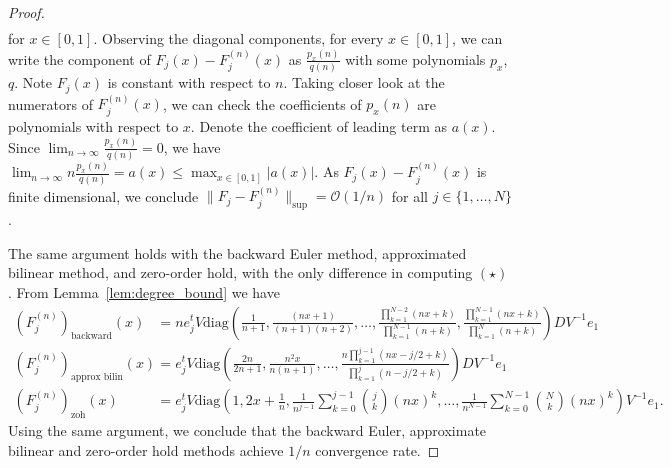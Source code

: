 \documentclass{article}
\theoremstyle{definition}
\newcommand{\pr}[1]{ \left( #1 \right) }
\newcommand{\abs}[1]{\left| #1 \right|}
\begin{document}
\begin{proof}
\begin{align*}
 \end{align*}
for $x \in [0,1]$. 
Observing the diagonal components, 
for every $x\in[0,1]$, we can write the component of $F_j(x)-F_j^{(n)}(x)$ as $\frac{p_x(n)}{q(n)}$ with some polynomials $p_x$, $q$. Note $F_j(x)$ is constant with respect to $n$. Taking closer look at the numerators of $F_j^{(n)}(x)$, we can check the coefficients of $p_x(n)$ are polynomials with respect to $x$. Denote the coefficient of leading term as $a(x)$. 
Since $\lim_{n\to\infty} \frac{p_x(n)}{q(n)}=0$, we have $\lim_{n\to\infty} n\frac{p_x(n)}{q(n)}=a(x) \le \max_{x\in[0,1]} \abs{a(x)}$. As $F_j(x)-F_j^{(n)}(x)$ is finite dimensional, we conclude $\|F_j-F_j^{(n)}\|_{\sup} = \mathcal{O}(1/n)$ for all $j \in \{1, \dots, N\}$. 

The same argument holds with the backward Euler method, approximated bilinear method, and zero-order hold, with the only difference in computing $(\star)$.
From Lemma~\ref{lem:degree_bound} we have 
\begin{align*}
    (F_j^{(n)})_{\text{backward}} (x)
    &= n e_j^{t} V \text{diag}\pr{ \frac{1}{n+1}, \frac{ \pr{ nx+1}}{(n+1)(n+2)}, \dots, \frac{\prod_{k=1}^{N-2}\pr{ nx + k } }{{\prod_{k=1}^{N-1}\pr{ n + k }}}, \frac{\prod_{k=1}^{N-1}\pr{ nx + k } }{{\prod_{k=1}^{N}\pr{ n + k }}}} D V^{-1} e_1 \\
    (F_j^{(n)})_{\text{approx bilin}} (x)
    &= e_j^t V \text{diag}
    \pr{ \frac{2n}{2n+1}, \frac{n^2x}{n(n+1)}, \dots, \frac{n\prod_{k=1}^{j-1}\pr{ nx - j/2 + k } }{{\prod_{k=1}^{j}\pr{ n - j/2 + k}}}} D V^{-1} e_1 \\
    (F_j^{(n)})_{\text{zoh}} (x)
    &= e_j^t V \text{diag} \pr{
    1, 2x + \frac{1}{n}, 
    \frac{1}{n^{j-1}} \sum_{k=0}^{j-1} \binom{j}{k} \pr{nx}^k, \dots,
    \frac{1}{n^{N-1}} \sum_{k=0}^{N-1} \binom{N}{k} \pr{nx}^k
    }V^{-1}e_1.
\end{align*}
Using the same argument, we conclude that the backward Euler, approximate bilinear and zero-order hold methods achieve $1/n$ convergence rate.


\end{proof}
\end{document}
